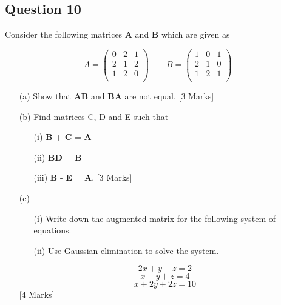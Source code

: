 \documentclass[a4paper,12pt]{article}
\begin{document}
\subsection*{Question 10}
Consider the following matrices \textbf{A} and \textbf{B} which are given as


\[ A = \left(
  \begin{array}{ccc}
0 & 2 & 1 \\
2 &1 &2\\
1 &2 &0\\
  \end{array}
\right) \qquad
B = \left(
\begin{array}{ccc}
1 &0 &1\\
2 &1 &0\\
1 &2 &1\\
\end{array}
\right)
\]

\begin{itemize}
\item[(a)] Show that \textbf{AB} and \textbf{BA} are not equal. [3 Marks]
\item[(b)] Find matrices C, D and E such that
\begin{itemize}
\item[(i)] \textbf{B} + \textbf{C} = \textbf{A}
\item[(ii)] \textbf{BD} = \textbf{B}
\item[(iii)] \textbf{B} - \textbf{E} = \textbf{A}. [3 Marks]
\end{itemize}


\item[(c)]

\begin{itemize}
\item[(i)] Write down the augmented matrix for the following system of equations.
\item[(ii)] Use Gaussian elimination to solve the system. 
\end{itemize}
\[2x + y - z = 2\]
\[x - y + z = 4\]
\[x + 2y + 2z = 10\]
[4 Marks]
\end{itemize}
\end{document}
